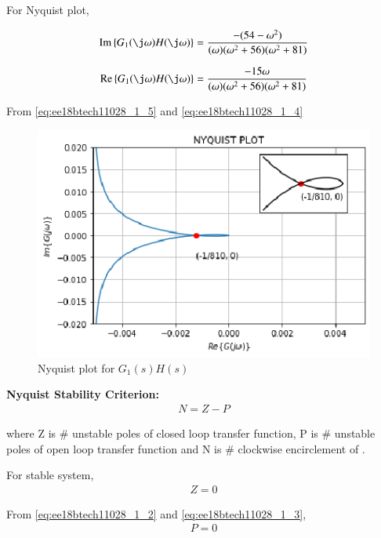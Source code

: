 \begin{enumerate}[label=\thesection.\arabic*.,ref=\thesection.\theenumi]
For Nyquist plot, 

\begin{align}
    \text{Im} \cbrak{G_{1}(\j \omega)H(\j \omega)}= \frac{-(54 - \omega^{2})}{(\omega)(\omega^{2}+56)(\omega^{2} + 81)}
    \label{eq:ee18btech11028_1_5}
\end{align}


\begin{align}
    \text{Re} \cbrak{G_{1}(\j \omega)H(\j \omega)}= \frac{-15 \omega}{(\omega)(\omega^{2}+56)(\omega^{2} + 81)}
    \label{eq:ee18btech11028_1_4}
\end{align}

From \ref{eq:ee18btech11028_1_5} and \ref{eq:ee18btech11028_1_4}

\begin{figure}[!h]
\includegraphics[width=\columnwidth]{./figs/ee18btech11028/ee18btech11028_1.eps}
    \centering
  \caption{Nyquist plot for $G_{1}(s)H(s)$}
  \label{fig:ee18btech11028_1_fig2}
\end{figure}


\textbf{Nyquist Stability Criterion:}
\begin{align}
    N = Z - P
\end{align}

where Z is \# unstable poles of closed loop transfer function, P is \# unstable poles of open loop transfer function
and N is \# clockwise encirclement of .

For stable system, 
\begin{align}
    Z = 0
\end{align}

From \ref{eq:ee18btech11028_1_2} and \ref{eq:ee18btech11028_1_3},
\begin{align}
    P = 0
\end{align}


\end{enumerate}
